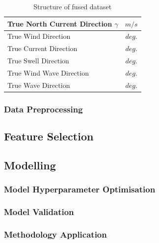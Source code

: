 \begin{table}
{\begin{tabular}{ |p{8cm}|c| }
    \hline
    True North Current Direction $\gamma$ & $m/s$\\
    \hline
    True Wind Direction & $deg.$ \\
    \hline
    True Current Direction & $deg.$ \\
    \hline
    True Swell Direction & $deg.$ \\
    \hline
    True Wind Wave Direction & $deg.$ \\
    \hline
    True Wave Direction & $deg.$ \\
    \hline
    \end{tabular}}
\caption{Structure of fused dataset}\label{dataset_init_struct}
\end{table}

\subsubsection{Data Preprocessing}\label{data_prep_sub}




\subsection{Feature Selection}\label{feature_select}

\subsection{Modelling}\label{modelling}

\subsubsection{Model Hyperparameter Optimisation}\label{hpo}

\subsubsection{Model Validation}\label{model_validation}

\subsubsection{Methodology Application}\label{methodology_application}



